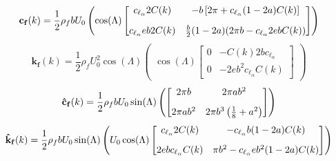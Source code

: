 \documentclass[10pt]{article}
\newcommand{\mbf}[1]{\mathbf{#1}}
\newcommand{\be}{\begin{eqnarray}}
\newcommand{\ee}{\end{eqnarray}}
\begin{document}
%
\begin{equation}
    \label{eqn:FluidDamp}
    \mbf{c_f}(k) =
    \frac{1}{2}\rho_f b U_0
    \left(
    \begin{aligned}
            \cos(\Lambda)
            \begin{bmatrix}
                \vspace{3mm}c_{\ell_{\alpha}} 2 C(k) & -b \left[2 \pi + c_{\ell_{\alpha}} (1-2a) C (k)\right]     \\
                c_{\ell_{\alpha}} eb 2C(k)           & \frac{b}{2} (1-2a)(2 \pi b - c_{\ell_{\alpha}} 2 eb C (k))
            \end{bmatrix}
        \end{aligned}
    \right)
\end{equation}
%
\begin{equation}
    \label{eqn:FluidStiff}
    \mbf{k_f}(k) = \frac{1}{2}\rho_f U_0^2 \cos(\Lambda)
    \left(
    \begin{aligned}
            \cos(\Lambda)
            \begin{bmatrix}
                0 & -C(k)2b c_{\ell_{\alpha}}     \\
                0 & -2eb^2 c_{\ell_{\alpha}} C(k)
            \end{bmatrix}
        \end{aligned}
    \right)
\end{equation}
%
\be
\label{eqn:FluidSweep}
\mbf{\hat{c}_f}(k) =
\frac{1}{2}\rho_f b U_0
\sin(\Lambda)
\left(
\begin{aligned}
        \begin{bmatrix}
            \vspace{3mm}2 \pi b & 2 \pi ab^2                           \\
            2\pi ab^2           & 2\pi b^3\left(\frac{1}{8}+a^2\right)
        \end{bmatrix}
    \end{aligned}
\right)
\ee
%
\begin{eqnarray}
    \mbf{\hat{k}_f}(k) =
    \frac{1}{2}\rho_f b U_0
    \sin(\Lambda)
    \left(
    \begin{aligned}
            U_0 \cos(\Lambda)
            \begin{bmatrix}
                \vspace{3mm} c_{\ell_{\alpha}}2 C (k) & - c_{\ell_{\alpha}} b (1-2a)C(k)          \\
                2ebc_{\ell_{\alpha}} C (k)            & \pi b^2  -c_{\ell_{\alpha}}eb^2(1-2a)C(k)
            \end{bmatrix}
        \end{aligned}
    \right)
\end{eqnarray}
\end{document}
